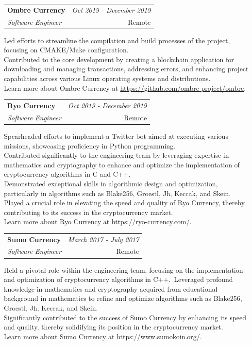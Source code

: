 \documentclass[a4paper,10pt]{article}
\makeatletter
\newcommand{\resumeSubheading}[4]{
	\vspace{0.5mm}\item
	\begin{tabular*}{0.98\textwidth}[t]{l@{\extracolsep{\fill}}r}
		\textbf{#1} & \textit{\footnotesize{#4}} \\
		\textit{\footnotesize{#3}} &  \footnotesize{#2}\\
	\end{tabular*}
	\vspace{-2.4mm}
}
\newcommand{\resumeItemListStart}{\begin{justify}\begin{itemize}[leftmargin=3ex, rightmargin=2ex, noitemsep,labelsep=1.2mm,itemsep=0mm]\small}
\newcommand{\resumeItemListEnd}{\end{itemize}\end{justify}\vspace{-2mm}}
\makeatother
\begin{document}
\vspace{-1mm}
\resumeSubheading
{Ombre Currency}{Remote}
{Software Engineer}{Oct 2019 - December 2019}
\resumeItemListStart
Led efforts to streamline the compilation and build processes of the project, focusing on CMAKE/Make configuration. \\
Contributed to the core development by creating a blockchain application for downloading and managing transactions, addressing errors, and enhancing project capabilities across various Linux operating systems and distributions. \\
Learn more about Ombre Currency at \url{https://github.com/ombre-project/ombre}.
\resumeItemListEnd

\vspace{-1mm}
\resumeSubheading
{Ryo Currency}{Remote}
{Software Engineer}{Oct 2019 - December 2019}
\resumeItemListStart
Spearheaded efforts to implement a Twitter bot aimed at executing various missions, showcasing proficiency in Python programming.\\
Contributed significantly to the engineering team by leveraging expertise in mathematics and cryptography to enhance and optimize the implementation of cryptocurrency algorithms in C and C++.\\
Demonstrated exceptional skills in algorithmic design and optimization, particularly in algorithms such as Blake256, Groestl, Jh, Keccak, and Skein.\\
Played a crucial role in elevating the speed and quality of Ryo Currency, thereby contributing to its success in the cryptocurrency market.\\
Learn more about Ryo Currency at https://ryo-currency.com/.
\resumeItemListEnd

\vspace{-1mm}
\resumeSubheading{Sumo Currency}{Remote}
{Software Engineer}{March 2017 - July 2017}
\resumeItemListStart
Held a pivotal role within the engineering team, focusing on the implementation and optimization of cryptocurrency algorithms in C++.\
Leveraged profound knowledge in mathematics and cryptography acquired from educational background in mathematics to refine and optimize algorithms such as Blake256, Groestl, Jh, Keccak, and Skein.\\
Significantly contributed to the success of Sumo Currency by enhancing its speed and quality, thereby solidifying its position in the cryptocurrency market.\\
Learn more about Sumo Currency at https://www.sumokoin.org/.
\resumeItemListEnd
\end{document}
